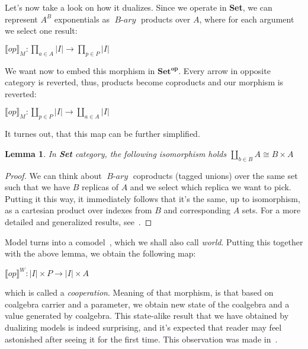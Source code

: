 \documentclass[declaration,shortabstract]{iithesis}
\theoremstyle{definition} \newtheorem{definition}{Definition}[chapter]
\theoremstyle{remark} \newtheorem{remark}[definition]{Observation}
\theoremstyle{plain} \newtheorem{theorem}[definition]{Theorem}
\theoremstyle{plain} \newtheorem{lemma}[definition]{Lemma}
\newcommand{\mathVar}[1]{{\operatorname{\mathit{#1}}}}
\begin{document}
    Let's now take a look on how it dualizes. Since we operate in \textbf{Set},
    we can represent $A^{B}$ exponentials as $\mathVar{B-ary}$ products over $A$,
    where for each argument we select one result:

    \begin{center}
        {$\displaystyle {\llbracket op \rrbracket}_M : \prod_{a \in A}{|I|} \rightarrow \prod_{p \in P}{|I|} $}
    \end{center}

    \noindent
    We want now to embed this morphism in $\mathbf{Set^{op}}$. Every arrow in opposite
    category is reverted, thus, products become coproducts and our morphism
    is reverted:

    \begin{center}
        {$\displaystyle {\llbracket op \rrbracket}_M : \coprod_{p \in P}{|I|} \rightarrow \coprod_{a \in A}{|I|} $}
    \end{center}

    \noindent
    It turnes out, that this map can be further simplified.

    \begin{lemma}
        In \textbf{Set} category, the following isomorphism holds
        {$\displaystyle \coprod_{b \in B}{A} \cong B \times A $}
    \end{lemma}
    \begin{proof}
        We can think about $\mathVar{B-ary}$ coproducts (tagged unions) over the same set
        such that we have $B$ replicas of $A$ and we select which replica we want
        to pick. Putting it this way, it immediately follows that it's the same,
        up to isomorphism, as a cartesian product over indexes from $B$ and
        corresponding $A$ sets. For a more detailed and generalized results,
        see~\cite{tensors}.
    \end{proof}

    Model turns into a comodel~\cite{comodels}, which we shall also call \textit{world}.
    Putting this together with the above lemma, we obtain the following map:

    \begin{center}
        $ {\llbracket op \rrbracket}^W : {|I|} \times {P} \rightarrow  {|I|} \times {A} $
    \end{center}

    \noindent
    which is called a \textit{cooperation}. Meaning of that morphism, is that
    based on coalgebra carrier and a parameter, we obtain new state of the
    coalgebra and a value generated by coalgebra. This state-alike result that
    we have obtained by dualizing models is indeed surprising, and it's
    expected that reader may feel astonished after seeing it for the first time.
    This observation was made in~\cite{tensors}.
\end{document}
